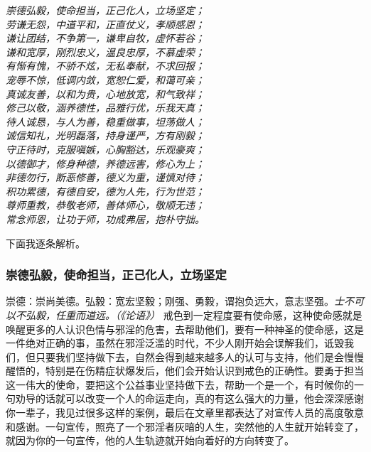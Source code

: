 \begin{center}\it
    崇德弘毅，使命担当，正己化人，立场坚定；\\ 劳谦无怨，中道平和，正直仗义，孝顺感恩；\\ 谦让团结，不争第一，谦卑自牧，虚怀若谷；\\ 谦和宽厚，刚烈忠义，温良忠厚，不慕虚荣；\\ 有惭有愧，不骄不炫，无私奉献，不求回报；\\ 宠辱不惊，低调内敛，宽恕仁爱，和蔼可亲；\\ 真诚友善，以和为贵，心地放宽，和气致祥；\\ 修己以敬，涵养德性，品雅行优，乐我天真；\\ 待人诚恳，与人为善，稳重做事，坦荡做人；\\ 诚信知礼，光明磊落，持身谨严，方有刚毅；\\ 守正待时，克服嗔嫉，心胸豁达，乐观豪爽；\\ 以德御才，修身种德，养德远害，修心为上；\\ 非德勿行，断恶修善，德义为重，谨慎对待；\\ 积功累德，有德自安，德为人先，行为世范；\\ 尊师重教，恭敬老师，善体师心，敬顺无违；\\ 常念师恩，让功于师，功成弗居，抱朴守拙。
\end{center}

下面我逐条解析。

\subsubsection{崇德弘毅，使命担当，正己化人，立场坚定}

崇德：崇尚美德。弘毅：宽宏坚毅；刚强、勇毅，谓抱负远大，意志坚强。\textit{士不可以不弘毅，任重而道远。（《论语》）} 戒色到一定程度要有使命感，这种使命感就是唤醒更多的人认识色情与邪淫的危害，去帮助他们，要有一种神圣的使命感，这是一件绝对正确的事，虽然在邪淫泛滥的时代，不少人刚开始会误解我们，诋毁我们，但只要我们坚持做下去，自然会得到越来越多人的认可与支持，他们是会慢慢醒悟的，特别是在伤精症状爆发后，他们会开始认识到戒色的正确性。要勇于担当这一伟大的使命，要把这个公益事业坚持做下去，帮助一个是一个，有时候你的一句劝导的话就可以改变一个人的命运走向，真的有这么强大的力量，他会深深感谢你一辈子，我见过很多这样的案例，最后在文章里都表达了对宣传人员的高度敬意和感谢。一句宣传，照亮了一个邪淫者灰暗的人生，突然他的人生就开始转变了，就因为你的一句宣传，他的人生轨迹就开始向着好的方向转变了。

